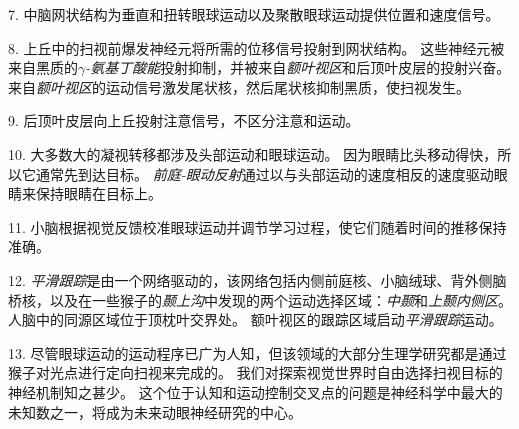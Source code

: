 7. 中脑网状结构为垂直和扭转眼球运动以及聚散眼球运动提供位置和速度信号。


8. 上丘中的扫视前爆发神经元将所需的位移信号投射到网状结构。
这些神经元被来自黑质的\textit{$ \gamma $-氨基丁酸能}投射抑制，并被来自\textit{额叶视区}和后顶叶皮层的投射兴奋。
来自\textit{额叶视区}的运动信号激发尾状核，然后尾状核抑制黑质，使扫视发生。


9. 后顶叶皮层向上丘投射注意信号，不区分注意和运动。


10. 大多数大的凝视转移都涉及头部运动和眼球运动。
因为眼睛比头移动得快，所以它通常先到达目标。
\textit{前庭-眼动反射}通过以与头部运动的速度相反的速度驱动眼睛来保持眼睛在目标上。


11. 小脑根据视觉反馈校准眼球运动并调节学习过程，使它们随着时间的推移保持准确。


12. \textit{平滑跟踪}是由一个网络驱动的，该网络包括内侧前庭核、小脑绒球、背外侧脑桥核，以及在一些猴子的\textit{颞上沟}中发现的两个运动选择区域：\textit{中颞}和\textit{上颞内侧区}。
人脑中的同源区域位于顶枕叶交界处。
额叶视区的跟踪区域启动\textit{平滑跟踪}运动。


13. 尽管眼球运动的运动程序已广为人知，但该领域的大部分生理学研究都是通过猴子对光点进行定向扫视来完成的。
我们对探索视觉世界时自由选择扫视目标的神经机制知之甚少。
这个位于认知和运动控制交叉点的问题是神经科学中最大的未知数之一，将成为未来动眼神经研究的中心。




